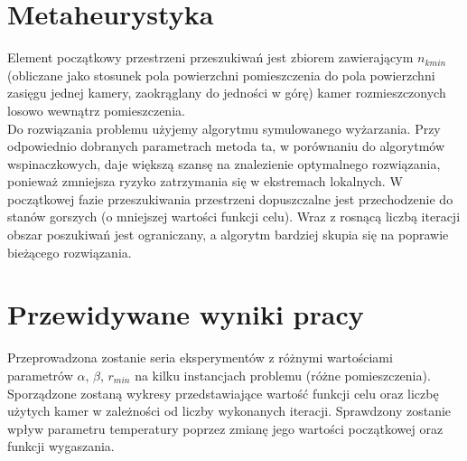 \documentclass[12pt,a4paper]{article}
\begin{document}
\section{Metaheurystyka}
Element początkowy przestrzeni przeszukiwań jest zbiorem zawierającym $n_{kmin}$ (obliczane jako stosunek pola powierzchni pomieszczenia do pola powierzchni zasięgu jednej kamery, zaokrąglany do jedności w górę) kamer rozmieszczonych losowo wewnątrz pomieszczenia.\\
Do rozwiązania problemu użyjemy algorytmu symulowanego wyżarzania. Przy odpowiednio dobranych parametrach metoda ta, w porównaniu do algorytmów wspinaczkowych, daje większą szansę na znalezienie optymalnego rozwiązania, ponieważ zmniejsza ryzyko zatrzymania się w ekstremach lokalnych. W początkowej fazie przeszukiwania przestrzeni dopuszczalne jest przechodzenie do stanów gorszych (o mniejszej wartości funkcji celu). Wraz z rosnącą liczbą iteracji obszar poszukiwań jest ograniczany, a algorytm bardziej skupia się na poprawie bieżącego rozwiązania.

\section{Przewidywane wyniki pracy}
Przeprowadzona zostanie seria eksperymentów z różnymi wartościami parametrów $\alpha$, $\beta$, $r_{min}$ na kilku instancjach problemu (różne pomieszczenia). Sporządzone zostaną wykresy przedstawiające wartość funkcji celu oraz liczbę użytych kamer w zależności od liczby wykonanych iteracji. Sprawdzony zostanie wpływ parametru temperatury poprzez zmianę jego wartości początkowej oraz funkcji wygaszania.
\end{document}
